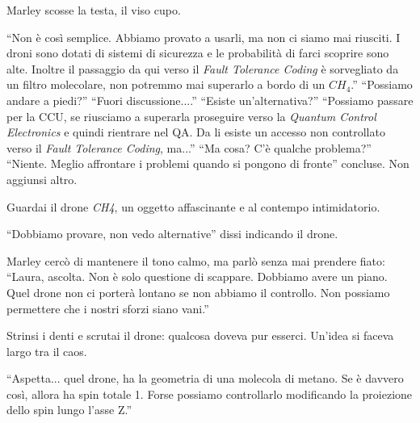 Marley scosse la testa, il viso cupo.

\begin{dialogue}
 \enquote{Non è così semplice. Abbiamo provato a usarli, ma non ci siamo mai riusciti. I droni sono dotati di sistemi di sicurezza e le probabilità di farci scoprire sono alte. Inoltre il passaggio da qui verso il \textit{Fault Tolerance Coding} è sorvegliato da un filtro molecolare, non potremmo mai superarlo a bordo di un $CH_4$.}
 \enquote{Possiamo andare a piedi?}
 \enquote{Fuori discussione....}
 \enquote{Esiste un'alternativa?}
 \enquote{Possiamo passare per la CCU, se riusciamo a superarla proseguire verso la \textit{Quantum Control Electronics}  e quindi rientrare nel QA. Da li esiste un accesso non controllato verso il \textit{Fault Tolerance Coding}, ma...}
 \enquote{Ma cosa? C'è qualche problema?}
 \enquote{Niente. Meglio affrontare i problemi quando si pongono di fronte} concluse. Non aggiunsi altro. 
\end{dialogue}

Guardai il drone \textit{CH4}, un oggetto affascinante e al contempo intimidatorio.

\begin{dialogue}
 \enquote{Dobbiamo provare, non vedo alternative} dissi indicando il drone.
\end{dialogue}

\begin{dialogue}
 Marley cercò di mantenere il tono calmo, ma parlò senza mai prendere fiato: \enquote{Laura, ascolta. Non è solo questione di scappare. Dobbiamo avere un piano. Quel drone non ci porterà lontano se non abbiamo il controllo. Non possiamo permettere che i nostri sforzi siano vani.}
\end{dialogue}





Strinsi i denti e scrutai il drone: qualcosa doveva pur esserci. Un'idea si faceva largo tra il caos.

\begin{dialogue}
 \enquote{Aspetta... quel drone, ha la geometria di una molecola di metano. Se è davvero così, allora ha spin totale 1. Forse possiamo controllarlo modificando la proiezione dello spin lungo l'asse Z.}
\end{dialogue}

